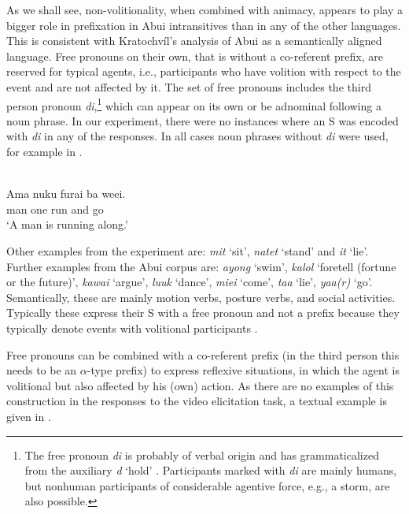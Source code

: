 As we shall see, non-volitionality, when combined with animacy, appears to play a bigger role in prefixation in Abui  intransitives than in any of the other languages. This is consistent with Kratochv\'il's analysis of Abui  as a semantically aligned  language. Free pronouns  on their own, that is without a co-referent prefix, are reserved for typical agents, i.e., participants who have volition with respect to the event and are not affected by it. The set of free pronouns  includes the third person pronoun \textit{di},\footnote{The free pronoun \textit{di} is probably of verbal origin and has grammaticalized from the auxiliary \textit{d} `hold' \citep{Kratochvil2011transitivity}. Participants marked with \textit{di} are mainly humans, but nonhuman participants of considerable agentive force, e.g., a storm, are also possible.} which can appear on its own or be adnominal following a noun phrase. In our experiment, there were no instances where an S was encoded with \textit{di} in any of the responses. In all cases noun phrases without \textit{di} were used, for example in .


\ea%
\label{bkm:Ref283206980}
 \\ 
\gll    Ama  nuku  furai  ba  weei.\\  
      man  one  run  and  go\\
\glt  `A man is running along.' 
\z







Other examples from the experiment are: \textit{mit} `sit', \textit{natet} `stand' and \textit{it} `lie'. Further examples from the Abui  corpus are: \textit{ayong} `swim', \textit{kalol} `foretell (fortune or the future)', \textit{kawai} `argue', \textit{luuk} `dance', \textit{miei} `come', \textit{taa} `lie', \textit{yaa(r)} `go'. Semantically, these are mainly motion verbs, posture verbs, and social activities. Typically these express their S with a free pronoun and not a prefix because they typically denote events with volitional participants . 

Free pronouns  can be combined with a co-referent prefix (in the third person this needs to be an $\alpha $-type prefix) to express reflexive situations, in which the agent is volitional but also affected by his (own) action. As there are no examples of this construction in the responses to the video elicitation task, a textual example is given in .


